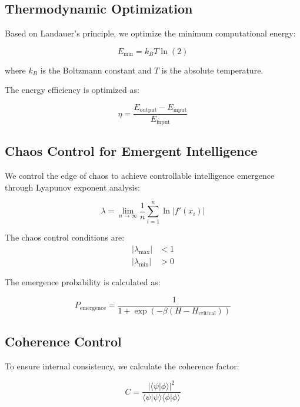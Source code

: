 \documentclass[12pt]{article}
\begin{document}
\subsection{Thermodynamic Optimization}

Based on Landauer's principle, we optimize the minimum computational energy:

\begin{equation}
E_{\min} = k_B T \ln(2)
\end{equation}

where $k_B$ is the Boltzmann constant and $T$ is the absolute temperature.

The energy efficiency is optimized as:

\begin{equation}
\eta = \frac{E_{\text{output}} - E_{\text{input}}}{E_{\text{input}}}
\end{equation}

\subsection{Chaos Control for Emergent Intelligence}

We control the edge of chaos to achieve controllable intelligence emergence through Lyapunov exponent analysis:

\begin{equation}
\lambda = \lim_{n \to \infty} \frac{1}{n} \sum_{i=1}^{n} \ln|f'(x_i)|
\end{equation}

The chaos control conditions are:
\begin{align}
|\lambda_{\max}| &< 1 \\
|\lambda_{\min}| &> 0
\end{align}

The emergence probability is calculated as:

\begin{equation}
P_{\text{emergence}} = \frac{1}{1 + \exp(-\beta(H - H_{\text{critical}}))}
\end{equation}

\subsection{Coherence Control}

To ensure internal consistency, we calculate the coherence factor:

\begin{equation}
C = \frac{|\langle \psi | \phi \rangle|^2}{\langle \psi | \psi \rangle \langle \phi | \phi \rangle}
\end{equation}
\end{document}
